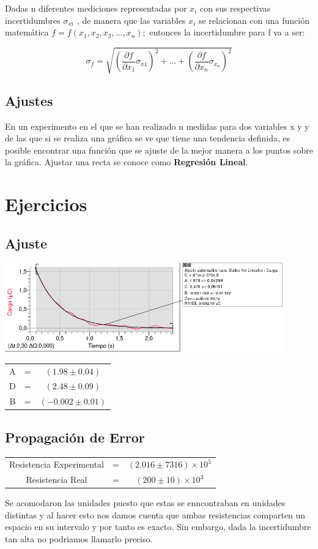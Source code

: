 \documentclass[12pt]{exam}
\newenvironment{Figura}
  {\par\medskip\noindent\minipage{\linewidth}}
  {\endminipage\par\medskip}
\begin{document}
\begin{multicols}{2}
  Dadas n diferentes mediciones representadas por $x_i$ con sus respectivas incertidumbres $\sigma_{xi}$ , de manera que las variables $x_i$ se relacionan con una función matemática $f = f(x_1,x_2,x_3,...,x_n);$ entonces la incertidumbre para f va a ser:

  $$\sigma_f = \sqrt{\left(\frac{\partial f}{\partial x_1}\sigma_{x1}\right)^2+...+\left(\frac{\partial f}{\partial x_n}\sigma_{x_n}\right)^2}$$

  \subsection{Ajustes}
  En un experimento en el que se han realizado n medidas para dos variables x y y de las que si se realiza una gráfica se ve que tiene una tendencia definida, es posible encontrar una función que se ajuste de la mejor manera a los puntos sobre la gráfica. Ajustar una recta se conoce como \textbf{Regresión Lineal}.
  \section{Ejercicios}
  \subsection{Ajuste}
  \begin{Figura}
    \centering
    \includegraphics[width=0.9\textwidth]{Imagen_1.jpeg}
    \label{fig}
\end{Figura}
  \begin{tabular}{|ccc|}
    \hline
    A & = & $(1.98 \pm 0.04)$\\
    D & = & $(2.48 \pm 0.09)$\\
    B & = & $(-0.002 \pm 0.01)$\\
    \hline
\end{tabular}
  \subsection{Propagación de Error}
  \begin{tabular}{|ccc|}
    Resistencia Experimental & = & $(2.016 \pm 7316)\times 10^{5}$\\
    Resistencia Real & = & $(200 \pm 10)\times 10^3$\\
  \end{tabular}
  Se acomodaron las unidades puesto que estas se enncontraban en unidades distintas y al hacer esto nos damos cuenta que ambas resistencias comparten un espacio en su intervalo y  por tanto es exacto. Sin embargo, dada la incertidumbre tan alta no podriamos llamarlo preciso.

\end{multicols}
\end{document}
